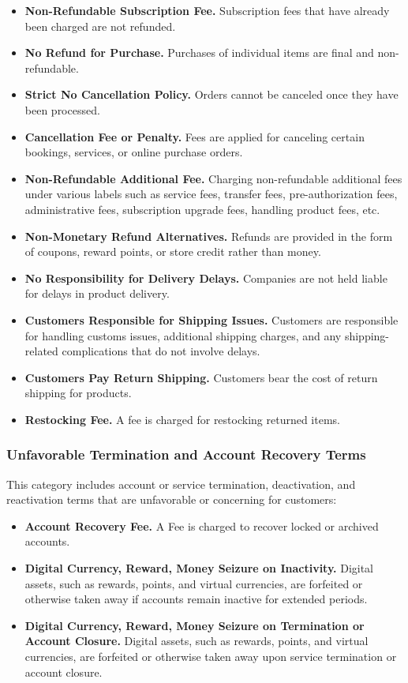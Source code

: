\begin{itemize}
    \item \textbf{Non-Refundable Subscription Fee.} Subscription fees that have already been charged are not refunded.
    \item \textbf{No Refund for Purchase.} Purchases of individual items are final and non-refundable.
    \item \textbf{Strict No Cancellation Policy.} Orders cannot be canceled once they have been processed.
    \item \textbf{Cancellation Fee or Penalty.} Fees are applied for canceling certain bookings, services, or online purchase orders.
    \item \textbf{Non-Refundable Additional Fee.} Charging non-refundable additional fees under various labels such as service fees, transfer fees, pre-authorization fees, administrative fees, subscription upgrade fees, handling product fees, etc.
    \item \textbf{Non-Monetary Refund Alternatives.} Refunds are provided in the form of coupons, reward points, or store credit rather than money.
    \item \textbf{No Responsibility for Delivery Delays.} Companies are not held liable for delays in product delivery.
    \item \textbf{Customers Responsible for Shipping Issues.} Customers are responsible for handling customs issues, additional shipping charges, and any shipping-related complications that do not involve delays.
    \item \textbf{Customers Pay Return Shipping.} Customers bear the cost of return shipping for products.
    \item \textbf{Restocking Fee.} A fee is charged for restocking returned items.
\end{itemize}

\subsubsection{Unfavorable Termination and Account Recovery Terms}
This category includes account or service termination, deactivation, and reactivation terms that are unfavorable or concerning for customers:

\begin{itemize}
    \item \textbf{Account Recovery Fee.} A Fee is charged to recover locked or archived accounts.
    \item \textbf{Digital Currency, Reward, Money Seizure on Inactivity.} Digital assets, such as rewards, points, and virtual currencies, are forfeited or otherwise taken away if accounts remain inactive for extended periods.
    \item \textbf{Digital Currency, Reward, Money Seizure on Termination or Account Closure.} Digital assets, such as rewards, points, and virtual currencies, are forfeited or otherwise taken away upon service termination or account closure.
\end{itemize}

